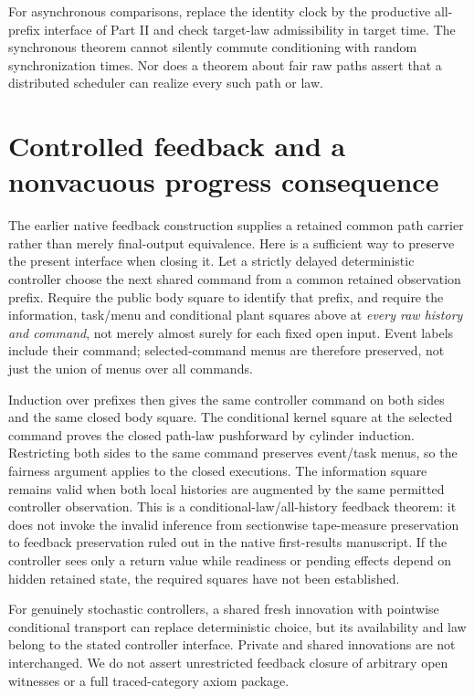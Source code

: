 \documentclass[11pt]{article}
\begin{document}
For asynchronous comparisons, replace the identity clock by the productive all-prefix interface of Part II and check target-law admissibility in target time. The synchronous theorem cannot silently commute conditioning with random synchronization times. Nor does a theorem about fair raw paths assert that a distributed scheduler can realize every such path or law.

\section{Controlled feedback and a nonvacuous progress consequence}
The earlier native feedback construction supplies a retained common path carrier rather than merely final-output equivalence. Here is a sufficient way to preserve the present interface when closing it. Let a strictly delayed deterministic controller choose the next shared command from a common retained observation prefix. Require the public body square to identify that prefix, and require the information, task/menu and conditional plant squares above at \emph{every raw history and command}, not merely almost surely for each fixed open input. Event labels include their command; selected-command menus are therefore preserved, not just the union of menus over all commands.

Induction over prefixes then gives the same controller command on both sides and the same closed body square. The conditional kernel square at the selected command proves the closed path-law pushforward by cylinder induction. Restricting both sides to the same command preserves event/task menus, so the fairness argument applies to the closed executions. The information square remains valid when both local histories are augmented by the same permitted controller observation. This is a conditional-law/all-history feedback theorem: it does not invoke the invalid inference from sectionwise tape-measure preservation to feedback preservation ruled out in the native first-results manuscript. If the controller sees only a return value while readiness or pending effects depend on hidden retained state, the required squares have not been established.

For genuinely stochastic controllers, a shared fresh innovation with pointwise conditional transport can replace deterministic choice, but its availability and law belong to the stated controller interface. Private and shared innovations are not interchanged. We do not assert unrestricted feedback closure of arbitrary open witnesses or a full traced-category axiom package.
\end{document}
